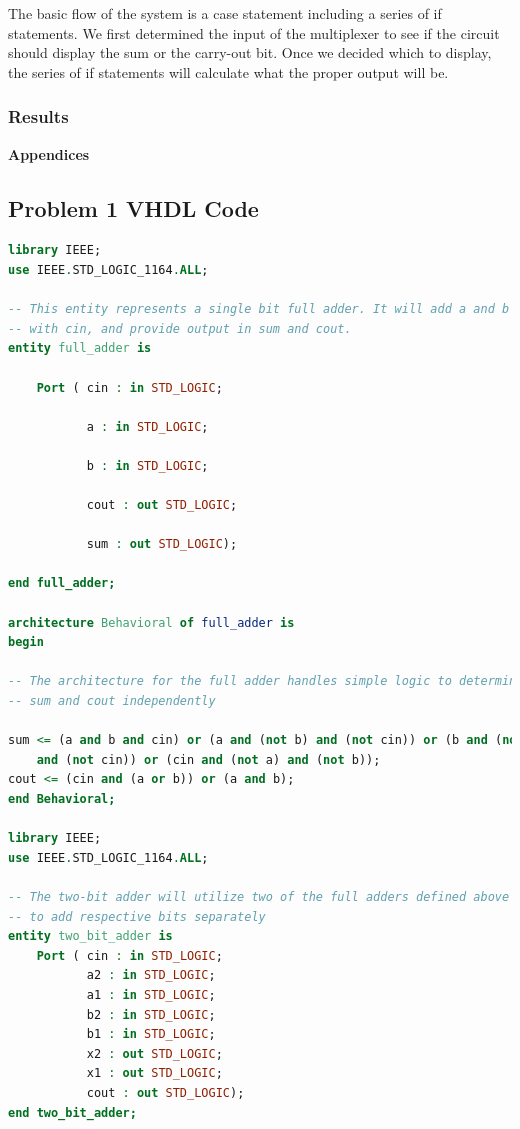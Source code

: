\documentclass[11pt]{article}
\begin{document}
The basic flow of the system is a case statement including a series of if statements. We first determined  the input of the multiplexer to see if the circuit should display the sum or the carry-out bit. Once we decided which to display, the series of if statements will calculate what the proper output will be.

\subsubsection{Results}


\pagebreak

\textbf{Appendices}

\begin{appendices}

\section{Problem 1 VHDL Code}

\begin{lstlisting}[language=VHDL]
library IEEE;
use IEEE.STD_LOGIC_1164.ALL;

-- This entity represents a single bit full adder. It will add a and b along 
-- with cin, and provide output in sum and cout.
entity full_adder is

    Port ( cin : in STD_LOGIC;

           a : in STD_LOGIC;

           b : in STD_LOGIC;

           cout : out STD_LOGIC;

           sum : out STD_LOGIC);

end full_adder;

architecture Behavioral of full_adder is
begin

-- The architecture for the full adder handles simple logic to determine 
-- sum and cout independently

sum <= (a and b and cin) or (a and (not b) and (not cin)) or (b and (not a) 
	and (not cin)) or (cin and (not a) and (not b));
cout <= (cin and (a or b)) or (a and b);
end Behavioral;

library IEEE;
use IEEE.STD_LOGIC_1164.ALL;

-- The two-bit adder will utilize two of the full adders defined above
-- to add respective bits separately
entity two_bit_adder is
    Port ( cin : in STD_LOGIC;
           a2 : in STD_LOGIC;
           a1 : in STD_LOGIC;
           b2 : in STD_LOGIC;
           b1 : in STD_LOGIC;
           x2 : out STD_LOGIC;
           x1 : out STD_LOGIC;
           cout : out STD_LOGIC);
end two_bit_adder;


\end{lstlisting}
\end{appendices}
\end{document}
